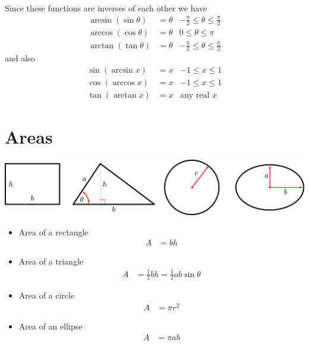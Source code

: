 Since these functions are inverses of each other we have
\begin{align*}
  \arcsin(\sin \theta) &= \theta & -\frac{\pi}{2} \leq \theta \leq \frac{\pi}{2} \\
  \arccos(\cos \theta) &= \theta & 0 \leq \theta \leq \pi \\
  \arctan(\tan \theta) &= \theta & -\frac{\pi}{2} \leq \theta \leq \frac{\pi}{2}
\end{align*}
and also
\begin{align*}
  \sin(\arcsin x) &= x & -1 \leq x \leq 1 \\
  \cos(\arccos x) &= x & -1 \leq x \leq 1 \\
  \tan(\arctan x) &= x & \text{any real $x$}
\end{align*}

\section{Areas}\label{app sec areas}
\begin{center}
 \includegraphics[width=\textwidth]{area2d}
\end{center}
\begin{itemize}
 \item Area of a rectangle
\begin{align*}
  A &= b h
\end{align*}
 \item Area of a triangle
\begin{align*}
  A &= \frac{1}{2} b h = \frac{1}{2} ab \sin \theta
\end{align*}
 \item Area of a circle
\begin{align*}
  A &= \pi r^2
\end{align*}
 \item Area of an ellipse
\begin{align*}
  A &= \pi ab
\end{align*}
\end{itemize}

